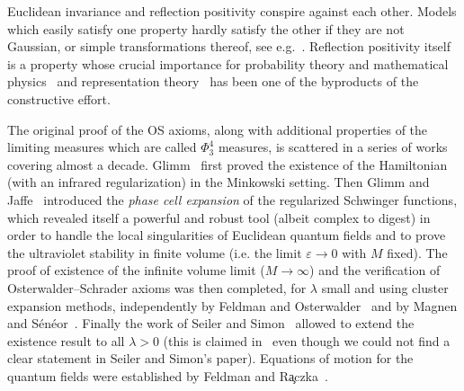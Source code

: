 \documentclass[a4paper,11pt]{article}
\newcommand{\tmtextit}[1]{{\itshape{#1}}}
\numberwithin{equation}{section}
\begin{document}
Euclidean invariance and reflection positivity conspire against each other. 
Models which easily satisfy one property hardly satisfy the other  if they
are not Gaussian, or simple transformations thereof, see e.g.~{\cite{albeverio_HC1_2002,albeverio_hida_2009}}. Reflection
positivity itself is a property whose crucial importance for probability theory and
mathematical physics~{\cite{kotecky_reflection_2009,jaffe_reflection_2018}}
and representation theory~{\cite{neeb_reflection_2018,jorgensen_reflection_2018}} has been one of
the byproducts of the constructive effort.



\medskip

The original proof of the OS axioms, along with additional properties of the
limiting measures which are called $\Phi^4_3$
measures, is scattered in a series of works covering almost a decade.
Glimm~{\cite{glimm_boson_1968}} first proved the existence of the Hamiltonian
(with an infrared regularization) in the Minkowski setting. Then Glimm and
Jaffe~{\cite{glimm_positivity_1973}} introduced the \tmtextit{phase cell
expansion} of the regularized Schwinger functions, which revealed itself a
powerful and robust tool (albeit complex to digest) in order to handle the local
 singularities of Euclidean quantum fields and  to prove the ultraviolet stability
in finite volume (i.e. the limit $\varepsilon\to 0$ with $M$ fixed). The proof of existence of the infinite volume limit ($M \to \infty$) and the
verification of Osterwalder--Schrader
axioms
was then
completed, for $\lambda$
small and using cluster expansion methods, independently by Feldman and Osterwalder~{\cite{feldman_wightman_1976}} and by Magnen and
S\'en\'eor~{\cite{magnen_infinite_1976}}. Finally
the work of Seiler and Simon~{\cite{seiler_nelsons_1976}} allowed to extend
the existence result to all $\lambda > 0$ (this is claimed in~{\cite{MR887102}} even though we could not find a clear statement in Seiler and Simon's paper). Equations of
motion for the quantum fields were established by Feldman and
R{\c{a}}czka~{\cite{feldman77}}.
\end{document}
